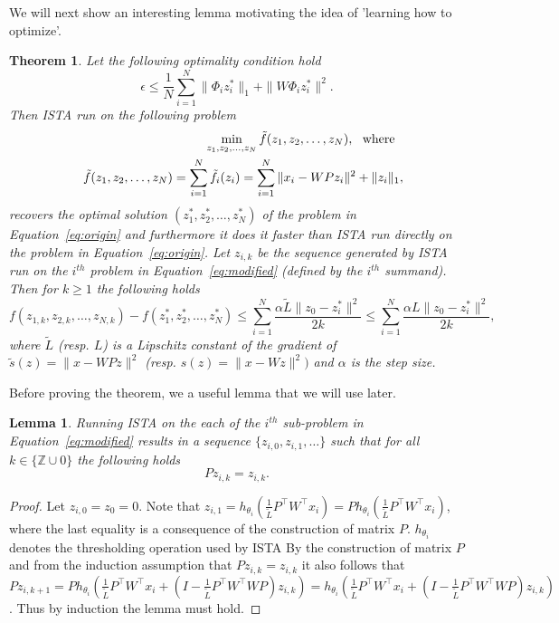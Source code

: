 \documentclass{article} %
\newtheorem{theorem}{Theorem}[section]
\newtheorem{lemma}{Lemma}[section]
\begin{document}
We will next show an interesting lemma motivating the idea of 'learning how to optimize'. 
\begin{theorem}
Let the following optimality condition hold
\[\epsilon \leq \frac{1}{N}\sum_{i=1}^N\|\Phi_i z^{*}_i\|_1 + \|W\Phi_i z^{*}_i\|^2.
\]
Then ISTA run on the following problem
\begin{eqnarray}
&&\min_{z_1,z_2,\dots,z_N} \tilde{f}(z_1,z_2,\dots,z_N), \text{\:\:\:where\:\:\:} \nonumber\\
&&\tilde{f}(z_1,z_2,\dots,z_N) = \sum_{i=1}^N\tilde{f}_i(z_i) = \sum_{i=1}^N\|x_i - WPz_i\|^2 + \|z_i\|_1,
\label{eq:modified}
\end{eqnarray}
recovers the optimal solution $(z^{*}_1,z^{*}_2,\dots,z^{*}_N)$ of the problem in Equation~\ref{eq:origin} and furthermore it does it faster than ISTA run directly on the problem in Equation~\ref{eq:origin}. Let $z_{i,k}$ be the sequence generated by ISTA run on the $i^{th}$ problem in Equation~\ref{eq:modified} (defined by the $i^{th}$ summand). Then for $k \geq 1$ the following holds
\begin{equation}
f(z_{1,k},z_{2,k},\dots,z_{N,k}) - f(z^{*}_1,z^{*}_2,\dots,z^{*}_N) \leq \sum_{i=1}^N\frac{\alpha\tilde{L}\|z_0 - z^{*}_i\|^2}{2k} \leq \sum_{i=1}^N\frac{\alpha L\|z_0 - z^{*}_i\|^2}{2k},
\label{eq:convrate}
\end{equation}
where $\tilde{L}$ (resp. $L$) is a Lipschitz constant of the gradient of $\tilde{s}(z) = \|x - WPz\|^2$ (resp. $s(z) = \|x - Wz\|^2)$ and $\alpha$ is the step size.
\label{thm:singlesubspace_simple}
\end{theorem}
Before proving the theorem, we a useful lemma that we will use later.
\begin{lemma}
Running ISTA on the each of the $i^{th}$ sub-problem in Equation~\ref{eq:modified} results in a sequence $\{z_{i,0},z_{i,1},\dots\}$ such that for all $k \in \{\mathbb{Z}\cup 0\}$ the following holds
\[Pz_{i,k} = z_{i,k}.
\]
\label{lem:Pzeqz}
\end{lemma}
\begin{proof}
Let $z_{i,0} = z_0 = 0$. Note that $z_{i,1} = h_{\theta_i}\left(\frac{1}{\tilde{L}}P^{\top}W^{\top}x_i\right) = Ph_{\theta_i}\left(\frac{1}{\tilde{L}}P^{\top}W^{\top}x_i\right)$, where the last equality is a consequence of the construction of matrix $P$. $h_{\theta_i}$ denotes the thresholding operation used by ISTA By the construction of matrix $P$ and from the induction assumption that $Pz_{i,k} = z_{i,k}$ it also follows that
$Pz_{i,k+1} = Ph_{\theta_i}\left(\frac{1}{\tilde{L}}P^{\top}W^{\top}x_i + \left(I - \frac{1}{\tilde{L}}P^{\top}W^{\top}WP\right)z_{i,k}\right) = h_{\theta_i}\left(\frac{1}{\tilde{L}}P^{\top}W^{\top}x_i + \left(I - \frac{1}{\tilde{L}}P^{\top}W^{\top}WP\right)z_{i,k}\right)$.
Thus by induction the lemma must hold.
\end{proof}
\end{document}
